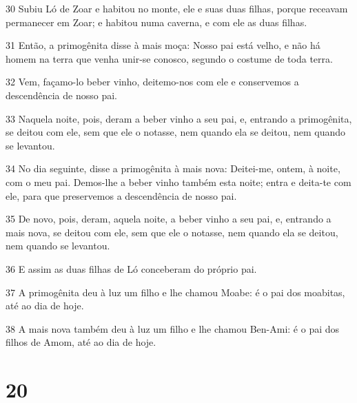 \par 30 Subiu Ló de Zoar e habitou no monte, ele e suas duas filhas, porque receavam permanecer em Zoar; e habitou numa caverna, e com ele as duas filhas.
\par 31 Então, a primogênita disse à mais moça: Nosso pai está velho, e não há homem na terra que venha unir-se conosco, segundo o costume de toda terra.
\par 32 Vem, façamo-lo beber vinho, deitemo-nos com ele e conservemos a descendência de nosso pai.
\par 33 Naquela noite, pois, deram a beber vinho a seu pai, e, entrando a primogênita, se deitou com ele, sem que ele o notasse, nem quando ela se deitou, nem quando se levantou.
\par 34 No dia seguinte, disse a primogênita à mais nova: Deitei-me, ontem, à noite, com o meu pai. Demos-lhe a beber vinho também esta noite; entra e deita-te com ele, para que preservemos a descendência de nosso pai.
\par 35 De novo, pois, deram, aquela noite, a beber vinho a seu pai, e, entrando a mais nova, se deitou com ele, sem que ele o notasse, nem quando ela se deitou, nem quando se levantou.
\par 36 E assim as duas filhas de Ló conceberam do próprio pai.
\par 37 A primogênita deu à luz um filho e lhe chamou Moabe: é o pai dos moabitas, até ao dia de hoje.
\par 38 A mais nova também deu à luz um filho e lhe chamou Ben-Ami: é o pai dos filhos de Amom, até ao dia de hoje.

\chapter{20}

